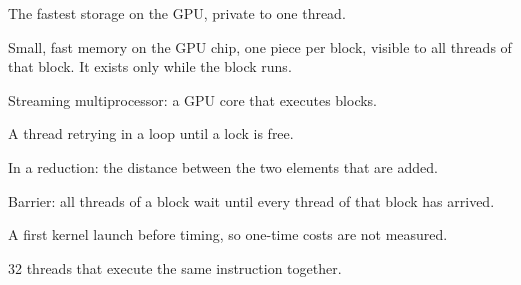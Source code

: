 \documentclass[main.tex]{subfiles}
\begin{document}
\begin{description}[nosep]
  \item[Register] The fastest storage on the GPU, private to one thread.
  \item[Shared memory] Small, fast memory on the GPU chip, one piece per block, visible to all threads of that block. It exists only while the block runs.
  \item[SM] Streaming multiprocessor: a GPU core that executes blocks.
  \item[Spinning] A thread retrying in a loop until a lock is free.
  \item[Stride] In a reduction: the distance between the two elements that are added.
  \item[\texttt{\_\_syncthreads()}] Barrier: all threads of a block wait until every thread of that block has arrived.
  \item[Warm-up] A first kernel launch before timing, so one-time costs are not measured.
  \item[Warp] 32 threads that execute the same instruction together.
\end{description}
\end{document}
